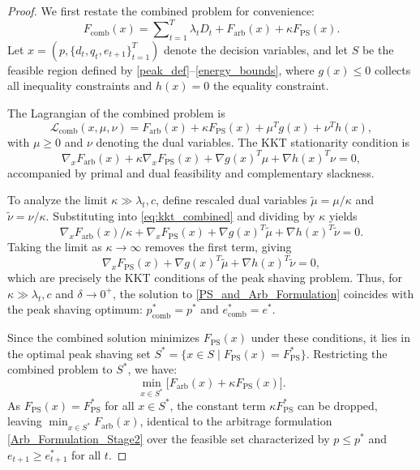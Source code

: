 \documentclass[conference]{IEEEtran}
\begin{document}
\begin{proof}
We first restate the combined problem for convenience:
\begin{equation}
    F_{\text{comb}}(x)=\sum\nolimits_{t=1}^T \lambda_t D_t + F_{\text{arb}}(x) + \kappa F_{\text{PS}}(x). \nonumber
\end{equation}
Let $x=(p,\{d_t,q_t,e_{t+1}\}_{t=1}^T)$ denote the decision variables, and let $S$ be the feasible region defined by \eqref{peak_def}–\eqref{energy_bounds}, where $g(x)\le0$ collects all inequality constraints and $h(x)=0$ the equality constraint.  

The Lagrangian of the combined problem is
\begin{equation}
    \mathcal{L}_{\text{comb}}(x,\mu,\nu)=F_{\text{arb}}(x)+\kappa F_{\text{PS}}(x)+\mu^T g(x)+\nu^T h(x),
\end{equation}
with $\mu\ge0$ and $\nu$ denoting the dual variables. The KKT stationarity condition is
\begin{equation}\label{eq:kkt_combined}
    \nabla_x F_{\text{arb}}(x)+\kappa\nabla_x F_{\text{PS}}(x)+\nabla g(x)^T\mu+\nabla h(x)^T\nu=0,
\end{equation}
accompanied by primal and dual feasibility and complementary slackness.  

To analyze the limit $\kappa \gg \lambda_t, c$, define rescaled dual variables $\tilde{\mu}=\mu/\kappa$ and $\tilde{\nu}=\nu/\kappa$. Substituting into \eqref{eq:kkt_combined} and dividing by $\kappa$ yields
\begin{equation}\label{eq:kkt_rescaled}
   \nabla_x F_{\text{arb}}(x)/\kappa+\nabla_x F_{\text{PS}}(x)+\nabla g(x)^T\tilde{\mu}+\nabla h(x)^T\tilde{\nu}=0.
\end{equation}
Taking the limit as $\kappa\to\infty$ removes the first term, giving
\begin{equation}\label{eq:kkt_ps_stage1}
    \nabla_x F_{\text{PS}}(x)+\nabla g(x)^T\tilde{\mu}+\nabla h(x)^T\tilde{\nu}=0,
\end{equation}
which are precisely the KKT conditions of the peak shaving problem. Thus, for $\kappa\gg\lambda_t, c$ and $\delta\to0^+$, the solution to \eqref{PS_and_Arb_Formulation} coincides with the peak shaving optimum: $p_{\text{comb}}^*=p^*$ and $e_{\text{comb}}^*=e^*$.  

Since the combined solution minimizes $F_{\text{PS}}(x)$ under these conditions, it lies in the optimal peak shaving set $S^*=\{x\in S\mid F_{\text{PS}}(x)=F_{\text{PS}}^*\}$. Restricting the combined problem to $S^*$, we have:
\[
    \min_{x\in S^*}\big[F_{\text{arb}}(x)+\kappa F_{\text{PS}}(x)\big].
\]
As $F_{\text{PS}}(x)=F_{\text{PS}}^*$ for all $x\in S^*$, the constant term $\kappa F_{\text{PS}}^*$ can be dropped, leaving $\min_{x\in S^*}F_{\text{arb}}(x)$, identical to the arbitrage formulation \eqref{Arb_Formulation_Stage2} over the feasible set characterized by $p\le p^*$ and $e_{t+1}\ge e_{t+1}^*$ for all $t$.  


\end{proof}
\end{document}
